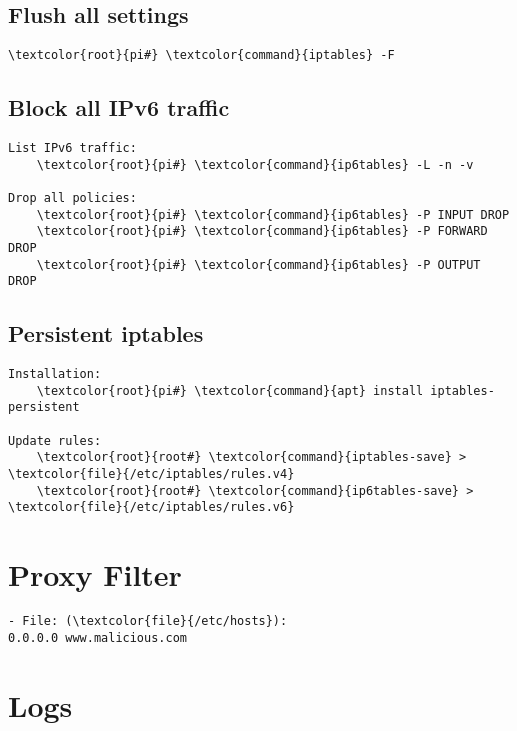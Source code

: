 \documentclass[10pt, a4paper, onecolumn, openany]{book} %
\begin{document}
\subsection{Flush all settings}
\begin{Verbatim}[commandchars=\\\{\}]
    \textcolor{root}{pi#} \textcolor{command}{iptables} -F
\end{Verbatim}

\subsection{Block all IPv6 traffic}
\begin{Verbatim}[commandchars=\\\{\}]
List IPv6 traffic:
    \textcolor{root}{pi#} \textcolor{command}{ip6tables} -L -n -v   

Drop all policies:
    \textcolor{root}{pi#} \textcolor{command}{ip6tables} -P INPUT DROP
    \textcolor{root}{pi#} \textcolor{command}{ip6tables} -P FORWARD DROP
    \textcolor{root}{pi#} \textcolor{command}{ip6tables} -P OUTPUT DROP 
\end{Verbatim}

\subsection{Persistent iptables}
\begin{Verbatim}[commandchars=\\\{\}]
Installation:
    \textcolor{root}{pi#} \textcolor{command}{apt} install iptables-persistent

Update rules:
    \textcolor{root}{root#} \textcolor{command}{iptables-save} > \textcolor{file}{/etc/iptables/rules.v4}
    \textcolor{root}{root#} \textcolor{command}{ip6tables-save} > \textcolor{file}{/etc/iptables/rules.v6}
\end{Verbatim}

\section{Proxy Filter}
\begin{Verbatim}[commandchars=\\\{\}]
- File: (\textcolor{file}{/etc/hosts}):
0.0.0.0 www.malicious.com
\end{Verbatim}

\section{Logs}
\end{document}
